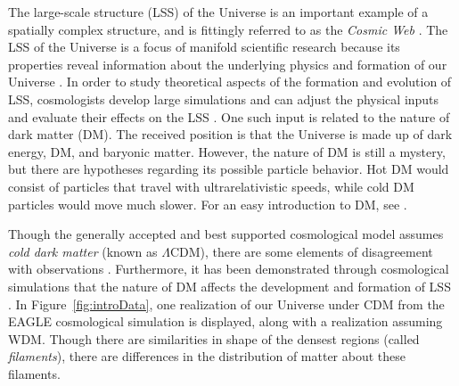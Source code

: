 \documentclass[12pt]{article}
\newcommand{\figref}[1]{Figure~\ref{#1}}
\begin{document}
The large-scale structure (LSS) of the Universe is an important example of a spatially complex structure, and is fittingly referred to as the \emph{Cosmic Web} \citep{bond1996filaments,springel2006large}. The LSS of the Universe is a focus of manifold scientific research because its properties reveal information about the underlying physics and formation of our Universe \citep{davis1985evolution}. In order to study theoretical aspects of the formation and evolution of LSS, cosmologists develop large simulations and can adjust the physical inputs and evaluate their effects on the LSS \citep{cooray2002halo,centrella1983three,doroshkevich1980two,schaye2015eagle}. One such input is related to the nature of dark matter (DM). The received position is that the Universe is made up of dark energy, DM, and baryonic matter. However, the nature of DM is still a mystery, but there are hypotheses regarding its possible particle behavior. Hot DM would consist of particles that travel with ultrarelativistic speeds, while cold DM particles would move much slower. For an easy introduction to DM, see \cite[p. 61-63]{HilbeEtAl2014}.

Though the generally accepted and best supported cosmological model assumes \emph{cold dark matter} (known as $\Lambda$CDM), there are some elements of disagreement with observations \citep{SchneiderEtAl2012}. Furthermore, it has been demonstrated through cosmological simulations that the nature of DM affects the development and formation of LSS \citep{SchneiderEtAl2012}.
In \figref{fig:introData}, one realization of our Universe under CDM from the EAGLE cosmological simulation \citep{schaye2015eagle} is displayed, along with a realization assuming WDM. Though there are similarities in shape of the densest regions (called \emph{filaments}), there are differences in the distribution of matter about these filaments.
\end{document}
